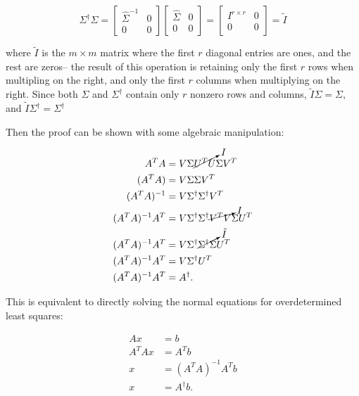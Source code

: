 \documentclass{template}
\begin{document}
\begin{equation}
  \Sigma^\dagger \Sigma = \begin{bmatrix}
    \hat{\Sigma}^{-1} & 0\\
    0 & 0
  \end{bmatrix}\begin{bmatrix}
    \hat{\Sigma} & 0\\
    0 & 0
  \end{bmatrix} = \begin{bmatrix}
    I^{r\times r} & 0\\
    0 & 0
  \end{bmatrix} = \tilde{I}
\end{equation}

where $\tilde{I}$ is the $m\times m$ matrix where the first $r$ diagonal entries are ones, and the rest are zeros-- the result of this operation is retaining only the first $r$ rows when multipling on the right, and only the first $r$ columns when multiplying on the right. Since both $\Sigma$ and $\Sigma^\dagger$ contain only $r$ nonzero rows and columns, $\tilde{I}\Sigma = \Sigma$, and $\tilde{I}\Sigma^\dagger = \Sigma^\dagger$

Then the proof can be shown with some algebraic manipulation:

\begin{equation}
  \begin{aligned}
    A^T A &=  V\Sigma \cancelto{I}{U^T U} \Sigma V^T\\
    (A^T A) &=V\Sigma\Sigma V^T\\
    (A^T A)^{-1} &= V\Sigma^\dagger\Sigma^\dagger V^T\\
    (A^T A)^{-1}A^T &= V\Sigma^\dagger\Sigma^\dagger \cancelto{I}{V^T V} \Sigma U^T\\
    (A^T A)^{-1}A^T &= V\Sigma^\dagger \cancelto{\tilde{I}}{\Sigma^\dagger \Sigma} U^T\\
    (A^T A)^{-1}A^T &= V\Sigma^\dagger U^T\\
    (A^T A)^{-1}A^T &= A^\dagger.
  \end{aligned}
\end{equation}

This is equivalent to directly solving the normal equations for overdetermined least squares:

\begin{equation}
  \begin{aligned}
    Ax &= b\\
    A^T Ax &= A^T b\\
    x &= (A^T A)^{-1} A^T b\\
    x &=A^\dagger b.
  \end{aligned}
\end{equation}
\end{document}

